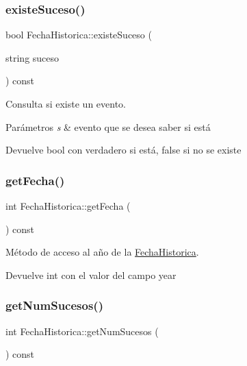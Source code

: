 \subsubsection{\texorpdfstring{existe\+Suceso()}{existeSuceso()}}
{\footnotesize\ttfamily bool Fecha\+Historica\+::existe\+Suceso (\begin{DoxyParamCaption}\item[{string}]{suceso }\end{DoxyParamCaption}) const}



Consulta si existe un evento. 


\begin{DoxyParams}{Parámetros}
{\em s} & evento que se desea saber si está \\
\hline
\end{DoxyParams}
\begin{DoxyReturn}{Devuelve}
bool con verdadero si está, false si no se existe 
\end{DoxyReturn}
\mbox{\label{classFechaHistorica_acf81e1528a9c7e813626873745cd55d7}} 
\subsubsection{\texorpdfstring{get\+Fecha()}{getFecha()}}
{\footnotesize\ttfamily int Fecha\+Historica\+::get\+Fecha (\begin{DoxyParamCaption}{ }\end{DoxyParamCaption}) const}



Método de acceso al año de la \hyperlink{classFechaHistorica}{Fecha\+Historica}. 

\begin{DoxyReturn}{Devuelve}
int con el valor del campo year 
\end{DoxyReturn}
\mbox{\label{classFechaHistorica_aa63596d45eda999d9d65ea4eae22342f}} 
\subsubsection{\texorpdfstring{get\+Num\+Sucesos()}{getNumSucesos()}}
{\footnotesize\ttfamily int Fecha\+Historica\+::get\+Num\+Sucesos (\begin{DoxyParamCaption}{ }\end{DoxyParamCaption}) const}



